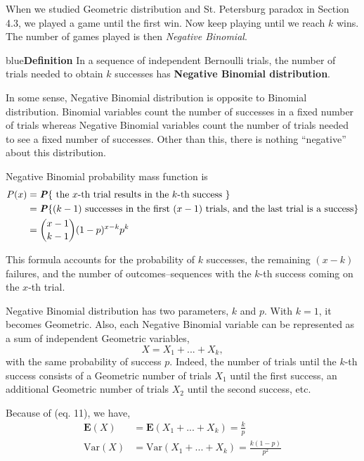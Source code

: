 \documentclass{article}
\newenvironment{definition}[1]{\begin{mybox}{blue}{\textbf{Definition #1}}}{\end{mybox}}
\newcommand{\prob}[1]{\textbf{\textit{P}}\{#1\}}
\begin{document}
When we studied Geometric distribution and St. Petersburg paradox in Section 4.3, we played a game until the first win. Now keep playing until we reach $k$ wins. The number of games played is then \textit{Negative Binomial}.

\begin{definition}{}
In a sequence of independent Bernoulli trials, the number of trials needed to obtain $k$ successes has \textbf{Negative Binomial distribution}.
\end{definition}

In some sense, Negative Binomial distribution is opposite to Binomial distribution. Binomial variables count the number of successes in a fixed number of trials whereas Negative Binomial variables count the number of trials needed to see a fixed number of successes. Other than this, there is nothing ``negative'' about this distribution.

Negative Binomial probability mass function is
\begin{align*}
    P(x) &= \prob{\text{ the $x$-th trial results in the $k$-th success }}\\
    &= \prob{(k-1) \text{   successes in the first $(x - 1)$ trials, and the last trial is a success}}\\
    &= \binom{x-1}{k-1} (1 - p)^{x-k} p^k
\end{align*}

This formula accounts for the probability of $k$ successes, the remaining $(x - k)$ failures, and the number of outcomes–sequences with the $k$-th success coming on the $x$-th trial.

Negative Binomial distribution has two parameters, $k$ and $p$. With $k = 1$, it becomes Geometric. Also, each Negative Binomial variable can be represented as a sum of independent Geometric variables,
\setcounter{equation}{10}
\begin{equation}
    X = X_1 + ... + X_k,
\end{equation}
with the same probability of success $p$. Indeed, the number of trials until the $k$-th success consists of a Geometric number of trials $X_1$ until the first success, an additional Geometric
number of trials $X_2$ until the second success, etc.

Because of (eq. 11), we have,
\begin{align*}
    \mathbf{E}(X) &= \mathbf{E}(X_1 + ... + X_k) =\frac{k}{p}\\
    \text{Var}(X) &= \text{Var}(X_1 + ... + X_k) = \frac{k (1 - p)}{p^2}
\end{align*}
\end{document}
